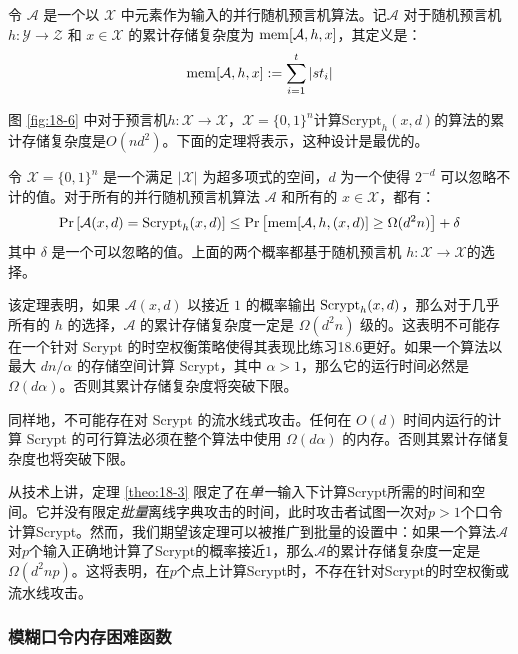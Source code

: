 \begin{definition}
	令 $\mathcal{A}$ 是一个以 $\mathcal{X}$ 中元素作为输入的并行随机预言机算法。记$\mathcal{A}$ 对于随机预言机 $h:\mathcal{Y}\to\mathcal{Z}$ 和 $x\in\mathcal{X}$ 的累计存储复杂度为 ${\rm mem}[\mathcal{A},h,x]$，其定义是：
	$${\rm mem}[\mathcal{A},h,x]:=\sum_{i=1}^t|st_i|$$
\end{definition}

图 \ref{fig:18-6} 中对于预言机$h:\mathcal{X}\to\mathcal{X}$，$\mathcal{X}=\{0,1\}^n$计算$\text{Scrypt}_h(x,d)$的算法的累计存储复杂度是$O(nd^2)$。下面的定理将表示，这种设计是最优的。

\begin{theorem}\label{theo:18-3}
	令 $\mathcal{X}=\{0,1\}^n$ 是一个满足 $|\mathcal{X}|$ 为超多项式的空间，$d$ 为一个使得 $2^{-d}$ 可以忽略不计的值。对于所有的并行随机预言机算法 $\mathcal{A}$ 和所有的 $x\in\mathcal{X}$，都有：
	$$
	  {\rm Pr}
	  \left[
	    \mathcal{A}(x,d)={\rm Scrypt}_h(x,d)
	  \right]
      \leq
      {\rm Pr}
      \left[
      {\rm mem}[\mathcal{A},h,(x,d)]\geq\Omega(d^2n)
      \right]+\delta
    $$
    其中 $\delta$ 是一个可以忽略的值。上面的两个概率都基于随机预言机 $h:\mathcal{X}\to\mathcal{X}$的选择。
\end{theorem}

该定理表明，如果 $\mathcal{A}(x,d)$ 以接近 $1$ 的概率输出 ${\rm Scrypt}_h(x,d)$，那么对于几乎所有的 $h$ 的选择，$\mathcal{A}$ 的累计存储复杂度一定是 $\Omega(d^2n)$ 级的。这表明不可能存在一个针对 Scrypt 的时空权衡策略使得其表现比练习18.6更好。如果一个算法以最大 ${dn}/{\alpha}$ 的存储空间计算 Scrypt，其中 $\alpha>1$，那么它的运行时间必然是 $\Omega(d\alpha)$。否则其累计存储复杂度将突破下限。

同样地，不可能存在对 Scrypt 的流水线式攻击。任何在 $O(d)$ 时间内运行的计算 Scrypt 的可行算法必须在整个算法中使用 $\Omega(d\alpha)$ 的内存。否则其累计存储复杂度也将突破下限。

从技术上讲，定理 \ref{theo:18-3} 限定了在\emph{单一}输入下计算Scrypt所需的时间和空间。它并没有限定\emph{批量}离线字典攻击的时间，此时攻击者试图一次对$p>1$个口令计算Scrypt。然而，我们期望该定理可以被推广到批量的设置中：如果一个算法$\mathcal{A}$对$p$个输入正确地计算了Scrypt的概率接近$1$，那么$\mathcal{A}$的累计存储复杂度一定是$\Omega(d^2np)$。这将表明，在$p$个点上计算Scrypt时，不存在针对Scrypt的时空权衡或流水线攻击。

\subsubsection{模糊口令内存困难函数}

